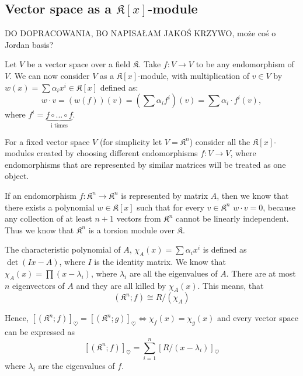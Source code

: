 {\color{red}
\subsection{Vector space as a $\mathfrak{K}[x]$-module}

{\large\color{cyan}DO DOPRACOWANIA, BO NAPISAŁAM JAKOŚ KRZYWO, może coś o Jordan basis?}

Let $V$ be a vector space over a field $\mathfrak{K}$. Take $f:V\to V$ to be any endomorphism of $V$. We can now consider $V$ as a $\mathfrak{K}[x]$-module, with multiplication of $v\in V$ by $w(x)=\sum \alpha_ix^i \in \mathfrak{K}[x]$ defined as:
$$w\cdot v=(w(f))(v)=(\sum \alpha_if^i)(v)=\sum \alpha_i\cdot f^i(v),$$
where $f^i=\underbrace{f\circ...\circ f}_{\text{i times}}$.

For a fixed vector space $V$ (for simplicity let $V=\mathfrak{K}^n$) consider all the $\mathfrak{K}[x]$-modules created by choosing different endomorphisms $f:V\to V$, where endomorphisms that are represented by similar matrices will be treated as one object. 

If an endomorphism $f:\mathfrak{K}^n\to\mathfrak{K}^n$ is represented by matrix $A$, then we know that there exists a polynomial $w\in\mathfrak{K}[x]$ such that for every $v\in\mathfrak{K}^n$ $w\cdot v=0$, because any collection of at least $n+1$ vectors from $\mathfrak{K}^n$ cannot be linearly independent. Thus we know that $\mathfrak{K}^n$ is a torsion module over $\mathfrak{K}$.

The characteristic polynomial of $A$, $\chi_A(x)=\sum \alpha_ix^i$ is defined as $\det(Ix-A)$, where $I$ is the identity matrix. We know that $\chi_A(x)=\prod (x-\lambda_i)$, where $\lambda_i$ are all the eigenvalues of $A$. There are at most $n$ eigenvectors of $A$ and they are all killed by $\chi_A(x)$. This means, that 
$$(\mathfrak{K}^n; f)\cong R/(\chi_A)$$

Hence, $[(\mathfrak{K}^n; f)]_\heartsuit=[(\mathfrak{K}^n; g)]_\heartsuit\iff \chi_f(x)=\chi_g(x)$ and every vector space can be expressed as
$$[(\mathfrak{K}^n;f)]_\heartsuit=\sum_{i=1}^n[R/(x-\lambda_i)]_\heartsuit$$
where $\lambda_i$ are the eigenvalues of $f$.
}

